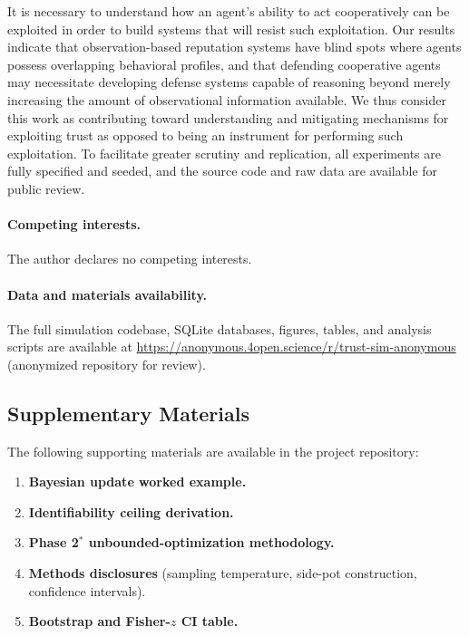 \documentclass[10pt]{article} %
\begin{document}
It is necessary to understand how an agent's ability to act cooperatively can be exploited in order to build systems that will resist such exploitation. Our results indicate that observation-based reputation systems have blind spots where agents possess overlapping behavioral profiles, and that defending cooperative agents may necessitate developing defense systems capable of reasoning beyond merely increasing the amount of observational information available. We thus consider this work as contributing toward understanding and mitigating mechanisms for exploiting trust as opposed to being an instrument for performing such exploitation. To facilitate greater scrutiny and replication, all experiments are fully specified and seeded, and the source code and raw data are available for public review.

\paragraph*{Competing interests.} The author declares no competing
interests.

\paragraph*{Data and materials availability.}
The full simulation codebase, SQLite databases, figures, tables,
and analysis scripts are available at
\url{https://anonymous.4open.science/r/trust-sim-anonymous}
(anonymized repository for review).



\subsection*{Supplementary Materials}
The following supporting materials are available in the project
repository:
\footnotesize\raggedright
\begin{enumerate}\setlength{\itemsep}{2pt}\setlength{\parskip}{0pt}\setlength{\leftmargini}{1.5em}
  \item \textbf{Bayesian update worked example.} 
  \item \textbf{Identifiability ceiling derivation.} 
  \item \textbf{Phase 2$^{*}$ unbounded-optimization methodology.} 
  \item \textbf{Methods disclosures} (sampling temperature, side-pot construction, confidence intervals). 
  \item \textbf{Bootstrap and Fisher-$z$ CI table.} 
\end{enumerate}
\end{document}
